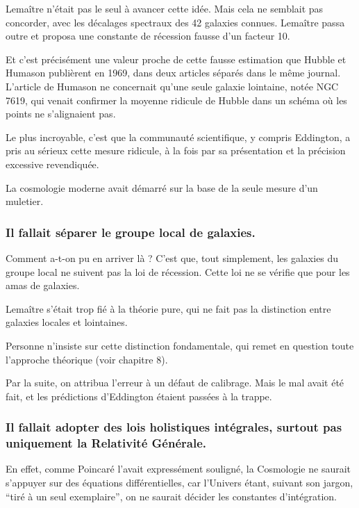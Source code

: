 \documentclass[a4paper,12pt]{article}
\begin{document}
Lemaître n’était pas le seul à avancer cette idée. Mais cela ne semblait pas concorder, avec les  décalages spectraux des 42 galaxies connues. Lema\^itre passa outre et proposa une constante de récession fausse d’un facteur 10.


Et c’est précisément une valeur proche de cette fausse estimation que Hubble et Humason publièrent en 1969, dans deux articles séparés dans le m\^eme journal. L’article de Humason ne concernait qu’une seule galaxie lointaine, notée NGC 7619, qui venait confirmer la moyenne ridicule de Hubble dans un schéma où les points ne s’alignaient pas. 


Le plus incroyable, c’est que la communauté scientifique, y compris Eddington, a pris au sérieux cette mesure ridicule, à la fois par sa présentation et la précision excessive revendiquée.


La cosmologie moderne avait démarré sur la base de la seule mesure d’un muletier.


\subsubsection{Il fallait séparer le groupe local de galaxies.} 

Comment a-t-on pu en arriver là ? C’est que, tout simplement, les galaxies du groupe local ne suivent pas la loi de récession. Cette loi ne se vérifie que pour les amas de galaxies. 


Lemaître s’était trop fié à la théorie pure, qui ne fait pas la distinction entre galaxies locales et lointaines.

Personne n’insiste sur cette distinction fondamentale, qui remet en question toute l’approche théorique (voir chapitre 8). 


Par la suite, on attribua l’erreur à un défaut de calibrage. Mais le mal avait été fait, et les prédictions d’Eddington étaient passées à la trappe.



\subsubsection{Il fallait adopter des lois holistiques intégrales, surtout pas uniquement la Relativité Générale.}
 
En effet, comme Poincaré l'avait expressément souligné, la Cosmologie ne saurait s'appuyer sur des équations différentielles, car l'Univers étant, suivant son jargon, ``tiré à un seul exemplaire'', on ne saurait décider les constantes d'intégration. 
\end{document}
